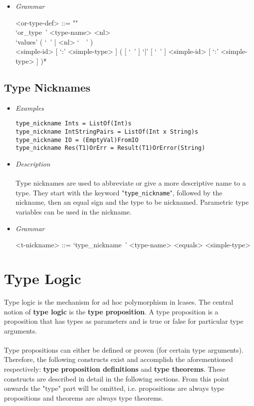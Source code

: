 \documentclass[diploma]{softlab-thesis}
\begin{document}
\begin{itemize}
\item \textit{Grammar}

\begin{grammar}
<or-type-def> ::= ""\\
`or_type\ ' <type-name> <nl> \\
`values' ( `\ ' | <nl> `\ \ ' ) \\
<simple-id> [ `:' <simple-type> ]
( [ `\ ' ] `|' [ `\ ' ] <simple-id> [ `:' <simple-type> ] )*
\end{grammar}

\end{itemize}

\subsection{Type Nicknames}

\begin{itemize}

\item \textit{Examples}

\begin{verbatim}
type_nickname Ints = ListOf(Int)s
type_nickname IntStringPairs = ListOf(Int x String)s
type_nickname IO = (EmptyVal)FromIO
type_nickname Res(T1)OrErr = Result(T1)OrError(String)
\end{verbatim}

\item \textit{Description} \\\\
Type nicknames are used to abbreviate or give a more descriptive name to a
type.  They start with the keyword "\verb|type_nickname|", followed by the
nickname, then an equal sign and the type to be nicknamed.
Parametric type variables can be used in the nickname.

\item \textit{Grammar}

\begin{grammar}
<t-nickname> ::=
`type_nickname\ ' <type-name> <equals> <simple-type>
\end{grammar}

\end{itemize}

\newpage
\section{Type Logic}
\label{subsec:typelogic}

Type logic is the mechanism for ad hoc polymorphism in lcases. The central
notion of \textbf{type logic} is the \textbf{type proposition}. A type
proposition is a proposition that has types as parameters and is true or false
for particular type arguments.
\\\\
Type propositions can either be defined or proven (for certain type arguments).
Therefore, the following constructs exist and accomplish the aforementioned
respectively: \textbf{type proposition definitions} and \textbf{type theorems}.
These constructs are described in detail in the following sections. From this
point onwards the "type" part will be omitted, i.e. propositions are always
type propositions and theorems are always type theorems.
\end{document}
